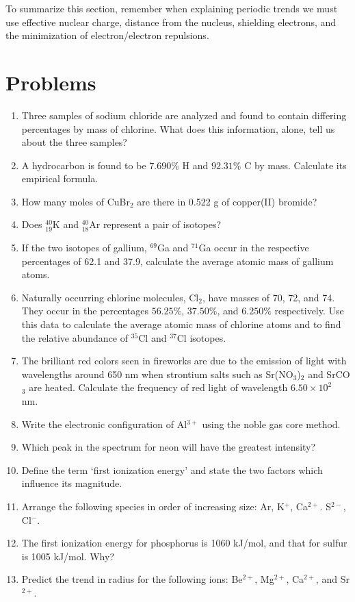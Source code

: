\documentclass[../chem.tex]{subfiles}
\begin{document}
To summarize this section, remember when explaining periodic trends we must use effective nuclear charge, distance from the nucleus, shielding electrons, and the minimization of electron/electron repulsions.

\pagebreak
\section*{Problems}
\begin{enumerate}
    \item Three samples of sodium chloride are analyzed and found to contain differing percentages by mass of chlorine. What does this information, alone, tell us about the three samples?
    \item A hydrocarbon is found to be $7.690\%$ H and $92.31\%$ C by mass. Calculate its empirical formula.
    \item How many moles of CuBr$_2$ are there in 0.522 g of copper(II) bromide?
    \item Does $^{40}_{19}$K and $^{40}_{18}$Ar represent a pair of isotopes?
    \item If the two isotopes of gallium, $^{69}$Ga and $^{71}$Ga occur in the respective percentages of 62.1 and 37.9, calculate the average atomic mass of gallium atoms.
    \item Naturally occurring chlorine molecules, Cl$_2$, have masses of 70, 72, and 74. They occur in the percentages $56.25\%$, $37.50\%$, and $6.250\%$ respectively. Use this data to calculate the average atomic mass of chlorine atoms and to find the relative abundance of $^{35}$Cl and $^{37}$Cl isotopes.
    \item The brilliant red colors seen in fireworks are due to the emission of light with wavelengths around 650 nm when strontium salts such as Sr(NO$_3$)$_2$ and SrCO$_3$ are heated. Calculate the frequency of red light of wavelength $6.50\times 10^2$ nm.
    \item Write the electronic configuration of Al$^{3+}$ using the noble gas core method.
    \item Which peak in the spectrum for neon will have the greatest intensity?
    \item Define the term `first ionization energy' and state the two factors which influence its magnitude.
    \item Arrange the following species in order of increasing size: Ar, K$^+$, Ca$^{2+}$. S$^{2-}$, Cl$^-$.
    \item The first ionization energy for phosphorus is 1060 kJ/mol, and that for sulfur is 1005 kJ/mol. Why?
    \item Predict the trend in radius for the following ions: Be$^{2+}$, Mg$^{2+}$, Ca$^{2+}$, and Sr$^{2+}$.
\end{enumerate}
\end{document}
